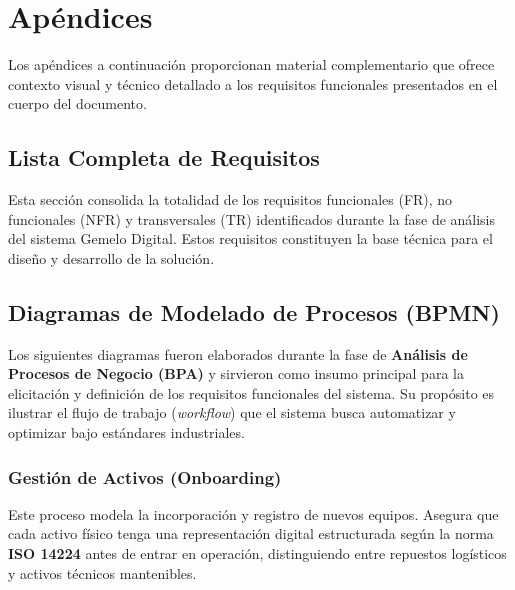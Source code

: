 \section{Apéndices}
\label{sec:apendices}

Los apéndices a continuación proporcionan material complementario que ofrece contexto visual y técnico detallado a los requisitos funcionales presentados en el cuerpo del documento.

\renewcommand{\thesubsection}{\Alph{subsection}}
\renewcommand{\thesubsubsection}{\thesubsection.\arabic{subsubsection}}

\subsection{Lista Completa de Requisitos}
\label{sec:apendice_requisitos}

Esta sección consolida la totalidad de los requisitos funcionales (FR), no funcionales (NFR) y transversales (TR) identificados durante la fase de análisis del sistema Gemelo Digital. Estos requisitos constituyen la base técnica para el diseño y desarrollo de la solución.







\newpage

\subsection{Diagramas de Modelado de Procesos (BPMN)}
\label{sec:apendice_bpmn}

Los siguientes diagramas fueron elaborados durante la fase de \textbf{Análisis de Procesos de Negocio (BPA)} y sirvieron como insumo principal para la elicitación y definición de los requisitos funcionales del sistema. Su propósito es ilustrar el flujo de trabajo (\textit{workflow}) que el sistema busca automatizar y optimizar bajo estándares industriales.

\subsubsection{Gestión de Activos (Onboarding)}
Este proceso modela la incorporación y registro de nuevos equipos. Asegura que cada activo físico tenga una representación digital estructurada según la norma \textbf{ISO 14224} antes de entrar en operación, distinguiendo entre repuestos logísticos y activos técnicos mantenibles.

